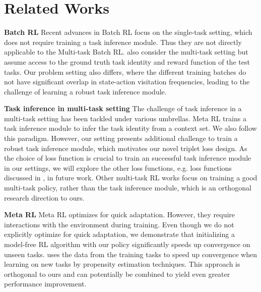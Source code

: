 \section{Related Works}\label{sec_related_works}

\textbf{Batch RL} 
Recent advances in Batch RL \cite{agarwal2019optimistic,kumar2019stabilizing,fujimoto2019off,chen2019bail,kumar2020conservative} focus on the single-task setting, which does not require training a task inference module. Thus they are not directly applicable to the Multi-task Batch RL. \cite{siegel2020keep, cabi2020ScalingDR} also consider the multi-task setting but assume access to the ground truth task identity and reward function of the test tasks. Our problem setting also differs, where the different training batches do not have significant overlap in state-action visitation frequencies, leading to the challenge of learning a robust task inference module.

\textbf{Task inference in multi-task setting}
The challenge of task inference in a multi-task setting has been tackled under 
various umbrellas. Meta RL \cite{rakelly2019efficient, zintgraf2020varibad,fakoor2019meta,humplik2019meta,lan2019meta,saemundsson2018meta,CAVIA} trains a task inference module to infer the task identity from a context set.
We also follow this paradigm. However, our setting presents additional challenge to train a robust task inference module, which motivates our novel 
triplet loss design. 
As the choice of loss function is crucial to train an successful task inference module in our settings, we will explore the other loss functions, e.g. loss functions discussed in \cite{roth2020revisiting}, in future work.
Other multi-task RL works \cite{espeholt2018impala, yang2020multi, yumulti,d2019sharing} focus on training a good multi-task policy, rather than the task inference module, which is an orthogonal research direction to ours.

\textbf{Meta RL} Meta RL \cite{lan2019meta,LearnToReinforceLearnWang2016,duan2016rl,finn2017maml,nichol2018Reptile,houthooft2018evolvedpg} optimizes for quick adaptation. However, they require interactions with the environment during training. Even though we do not explicitly optimize for quick adaptation, we demonstrate that initializing a model-free RL algorithm with our policy significantly speeds up
convergence on unseen tasks. \cite{fakoor2019meta} uses the data from the training tasks to speed up convergence when learning on new tasks by propensity estimation techniques. This approach is orthogonal to ours and can potentially be combined to yield even greater performance improvement.
